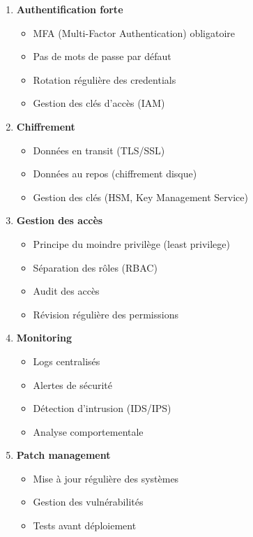 \documentclass[11pt,a4paper]{article}
\begin{document}
\begin{enumerate}
    \item \textbf{Authentification forte}
    \begin{itemize}
        \item MFA (Multi-Factor Authentication) obligatoire
        \item Pas de mots de passe par défaut
        \item Rotation régulière des credentials
        \item Gestion des clés d'accès (IAM)
    \end{itemize}
    
    \item \textbf{Chiffrement}
    \begin{itemize}
        \item Données en transit (TLS/SSL)
        \item Données au repos (chiffrement disque)
        \item Gestion des clés (HSM, Key Management Service)
    \end{itemize}
    
    \item \textbf{Gestion des accès}
    \begin{itemize}
        \item Principe du moindre privilège (least privilege)
        \item Séparation des rôles (RBAC)
        \item Audit des accès
        \item Révision régulière des permissions
    \end{itemize}
    
    \item \textbf{Monitoring}
    \begin{itemize}
        \item Logs centralisés
        \item Alertes de sécurité
        \item Détection d'intrusion (IDS/IPS)
        \item Analyse comportementale
    \end{itemize}
    
    \item \textbf{Patch management}
    \begin{itemize}
        \item Mise à jour régulière des systèmes
        \item Gestion des vulnérabilités
        \item Tests avant déploiement
    \end{itemize}
    

\end{enumerate}
\end{document}
